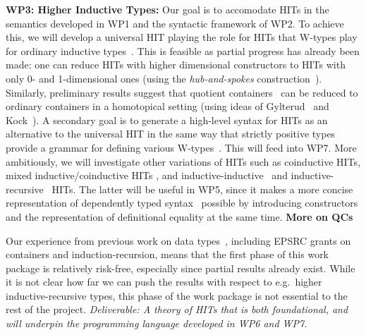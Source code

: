\documentclass[a4paper,11pt]{article}
\begin{document}

{\bf WP3: Higher Inductive Types:} Our goal is to accomodate HITs in
the semantics developed in WP1 and the syntactic framework of WP2. To
achieve this, we will develop a universal HIT playing the role for
HITs that W-types play for ordinary inductive
types~\cite{alti:icalp04}. This is feasible as partial progress has
already been made: one can reduce HITs with higher dimensional
constructors to HITs with only 0- and 1-dimensional ones (using the
\emph{hub-and-spokes} construction~\cite{hott-book}).
Similarly, preliminary results suggest that quotient
containers~\cite{abottAltenGhaniMcB:quotientContainers} can be reduced
to ordinary containers in a homotopical setting 
(using ideas of Gylterud~\cite{gylterud:thesis} and
Kock~\cite{kock:groupoids}).
%
A secondary goal is to generate a high-level syntax for HITs as
an alternative to the universal HIT in the same way that strictly
positive types provide a grammar for defining various
W-types~\cite{alti:cont-tcs,alti:jcats07}.  This will feed into WP7.
More ambitiously, we will %
investigate other variations of HITs such as coinductive HITs, mixed
inductive/coinductive HITs \cite{txa:mpc2010g}, and
inductive-inductive~\cite{fnf:indind} and
inductive-recursive~\cite{DS:indrec} HITs. The latter will be useful
in WP5, since it makes a more concise representation of dependently
typed syntax~\cite{chapman2009type} possible by introducing
constructors and the representation of definitional equality at the
same time.
{\bf More on QCs}

Our experience from previous work on data
types~\cite{alti:cont-tcs,alti:lics09,txa:cie10,alti:catind2,ghani:fibredIR,gambinoHyland:welfoundedTrees,awodeyGamSoja:indTypesInHTT},
including EPSRC grants on containers and induction-recursion, means
that the first phase of this work package is relatively risk-free,
especially since partial results already exist.
While it is not clear how far we can push the results with respect to
e.g.\ higher inductive-recursive types, this phase of the work package
is not essential to the rest of the project. {\em Deliverable: A
  theory of HITs that is both foundational, and will underpin the
  programming language developed in WP6 and WP7.}
\end{document}
